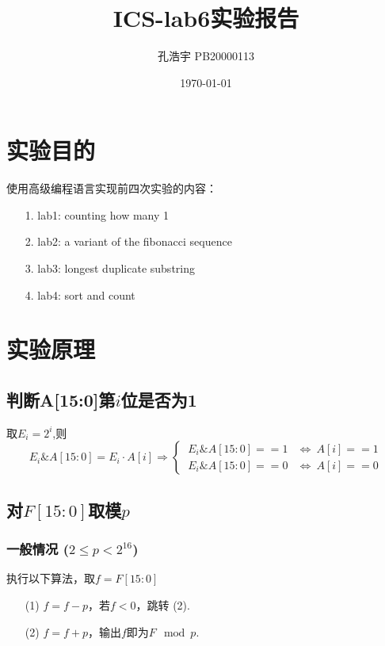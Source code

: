 \documentclass[UTF8]{ctexart}
\title{ICS-lab6实验报告}
\author{孔浩宇 PB20000113}
\date{\today}
\begin{document}
\fancyfoot[C]{\thepage}

\maketitle
\tableofcontents
\newpage

\section{实验目的}
    使用高级编程语言实现前四次实验的内容：
    \begin{enumerate}
        \item [1.]lab1: counting how many 1
        \item [2.]lab2: a variant of the fibonacci sequence
        \item [3.]lab3: longest duplicate substring
        \item [4.]lab4: sort and count
    \end{enumerate}


\section{实验原理}
    \subsection{判断A[15:0]第$i$位是否为1}
        取$E_i = 2^{i} $,则
            \[
                E_i \& A[15:0] = E_i \cdot A[i]
                \Rightarrow
                \begin{cases}
                    \ E_i \& A[15:0] == 1 &\Leftrightarrow\ A[i] == 1 \\
                    \ E_i \& A[15:0] == 0 &\Leftrightarrow\ A[i] == 0 
                \end{cases}
            \]

    \subsection{对$F[15:0]$取模$p$}
        \subsubsection{一般情况 ($2\leq p < 2^{16}$)}
            执行以下算法，取$f=F[15:0]$
            \begin{enumerate}
                \item [(1)]$f=f-p$，若$f<0$，跳转 (2).
                \item [(2)]$f=f+p$，输出$f$即为$F\mod p$.
            \end{enumerate}
\end{document}
